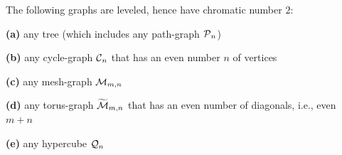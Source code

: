 \begin{corol}
\label{thm:list-2-colorables}
The following graphs are leveled, hence have chromatic number $2$:

\smallskip

{\bf (a)}
any tree (which includes any path-graph $\mbox{$\cal P$}_n$)

\smallskip

{\bf (b)}
any cycle-graph $\mbox{$\cal C$}_n$ that has an even number $n$ of vertices

\smallskip

{\bf (c)}
any mesh-graph $\mbox{$\cal M$}_{m,n}$

\smallskip

{\bf (d)}
any torus-graph $\widetilde{\mbox{$\cal M$}}_{m,n}$ that has an even number of diagonals, i.e., even $m+n$

\smallskip

{\bf (e)}
any hypercube $\mbox{$\cal Q$}_n$
\end{corol}

